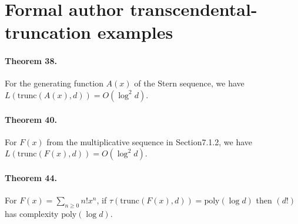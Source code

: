 \section*{Formal author transcendental-truncation examples}
\paragraph{Theorem 38.} For the generating function $A(x)$ of the Stern sequence, we have $L(\mathrm{trunc}(A(x),d))=O(\log^2d)$.
\paragraph{Theorem 40.} For $F(x)$ from the multiplicative sequence in Section7.1.2, we have $L(\mathrm{trunc}(F(x),d))=O(\log^2d)$.
\paragraph{Theorem 44.} For $F(x)=\sum_{n\ge0}n!x^n$, if $\tau(\mathrm{trunc}(F(x),d))=\mathrm{poly}(\log d)$ then $(d!)$ has complexity $\mathrm{poly}(\log d)$.
